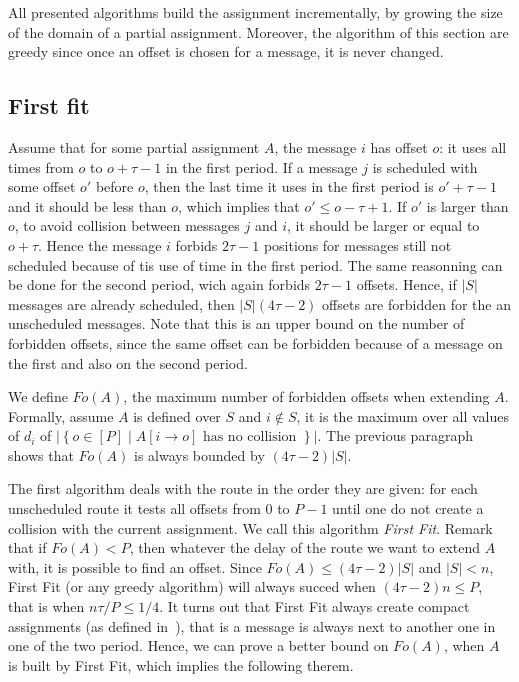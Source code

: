 \documentclass[10pt, conference, letterpaper]{IEEEtran}
\begin{document}
All presented algorithms build the assignment incrementally, by growing the size of the domain of a partial assignment. Moreover, the algorithm of this section are greedy since once an offset is chosen for a message, it is never changed.


\subsection{First fit}


Assume that for some partial assignment $A$, the message $i$ has offset $o$: it uses all times from $o$ to $o + \tau -1$ in the first period. If a message $j$ is scheduled with some offset $o'$ before $o$, then the last time it uses in the first period is $o'+\tau-1$ and it should be less than $o$, which implies that $o' \leq o - \tau + 1$. If $o'$ is larger than $o$, to avoid collision between messages $j$ and $i$, it should be larger or equal to $o+ \tau$. Hence the message $i$ forbids $2\tau -1$ positions for messages still not scheduled because of tis use of time in the first period. The same reasonning can be done for the second period, wich again forbids $2\tau -1$ offsets. Hence, if $|S|$ messages are already scheduled, then $|S|(4\tau -2)$ offsets are forbidden for the an unscheduled messages. Note that this is an upper bound on the number of forbidden offsets, since the same offset can be forbidden because of a message on the first and also on the second period.

We define $Fo(A)$, the maximum number of forbidden offsets when 
extending $A$. Formally, assume $A$ is defined over $S$ and $i\notin S$, 
it is the maximum over all values of $d_i$ of $|\left\{ o \in [P] \mid A[i \rightarrow o] \text{ has no collision }\right\}|$. The previous paragraph shows that $Fo(A)$ is always bounded by $(4 \tau -2)|S|$. 

The first algorithm deals with the route in the order they are given:  for each unscheduled route it tests all offsets from $0$ to $P-1$ until one do not create a collision with the current assignment.
We call this algorithm \emph{First Fit}. Remark that if $Fo(A) < P$, then whatever the delay of the route we want to extend $A$ with, it is possible to find an offset. Since $Fo(A) \leq (4 \tau -2)|S|$ and $|S| < n$, First Fit (or any greedy algorithm) will always succed 
when $(4 \tau -2)n \leq P$, that is when $ n\tau /P \leq 1/4$.
It turns out that First Fit always create compact assignments (as defined in~\cite{barth2018deterministic}), that is a message is always next to another one in one of the two period. Hence, we can prove a better bound on $Fo(A)$, when $A$ is built by First Fit, which
implies the following therem.
\end{document}

